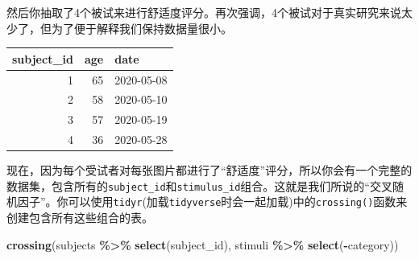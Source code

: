 \documentclass[
]{book}
\newenvironment{Shaded}{\begin{snugshade}}{\end{snugshade}}
\newcommand{\FunctionTok}[1]{\textcolor[rgb]{0.13,0.29,0.53}{\textbf{#1}}}
\newcommand{\NormalTok}[1]{#1}
\newcommand{\SpecialCharTok}[1]{\textcolor[rgb]{0.81,0.36,0.00}{\textbf{#1}}}
\begin{document}
然后你抽取了4个被试来进行舒适度评分。再次强调，4个被试对于真实研究来说太少了，但为了便于解释我们保持数据量很小。

\begin{tabular}{r|r|l}
\hline
subject\_id & age & date\\
\hline
1 & 65 & 2020-05-08\\
\hline
2 & 58 & 2020-05-10\\
\hline
3 & 57 & 2020-05-19\\
\hline
4 & 36 & 2020-05-28\\
\hline
\end{tabular}

现在，因为每个受试者对每张图片都进行了``舒适度''评分，所以你会有一个完整的数据集，包含所有的\texttt{subject\_id}和\texttt{stimulus\_id}组合。这就是我们所说的``交叉随机因子''。你可以使用\texttt{tidyr}(加载\texttt{tidyverse}时会一起加载)中的\texttt{crossing()}函数来创建包含所有这些组合的表。

\begin{Shaded}
\begin{Highlighting}[]
\FunctionTok{crossing}\NormalTok{(subjects }\SpecialCharTok{\%\textgreater{}\%} \FunctionTok{select}\NormalTok{(subject\_id),}
\NormalTok{         stimuli }\SpecialCharTok{\%\textgreater{}\%} \FunctionTok{select}\NormalTok{(}\SpecialCharTok{{-}}\NormalTok{category)) }
\end{Highlighting}
\end{Shaded}
\end{document}
